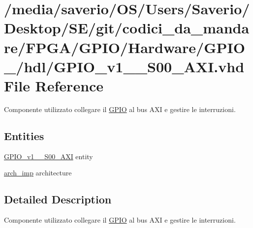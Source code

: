 \hypertarget{GPIO__v1__0__S00__AXI_8vhd}{}\section{/media/saverio/\+O\+S/\+Users/\+Saverio/\+Desktop/\+S\+E/git/codici\+\_\+da\+\_\+mandare/\+F\+P\+G\+A/\+G\+P\+I\+O/\+Hardware/\+G\+P\+I\+O\+\_/hdl/\+G\+P\+I\+O\+\_\+v1\+\_\+\_\+\+S00\+\_\+\+A\+XI.vhd File Reference}
\label{GPIO__v1__0__S00__AXI_8vhd}


Componente utilizzato collegare il \hyperlink{structGPIO}{G\+P\+IO} al bus A\+XI e gestire le interruzioni.  


\subsection*{Entities}
\begin{DoxyCompactItemize}
\item 
\hyperlink{classGPIO__v1__0__S00__AXI}{G\+P\+I\+O\+\_\+v1\+\_\+\_\+\+S00\+\_\+\+A\+XI} entity
\item 
\hyperlink{classGPIO__v1__0__S00__AXI_1_1arch__imp}{arch\+\_\+imp} architecture
\end{DoxyCompactItemize}


\subsection{Detailed Description}
Componente utilizzato collegare il \hyperlink{structGPIO}{G\+P\+IO} al bus A\+XI e gestire le interruzioni. 

